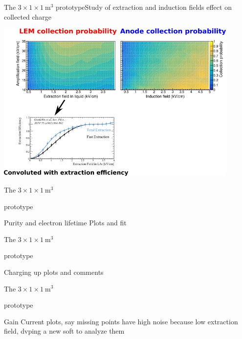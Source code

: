 \documentclass[10pt]{beamer}
\begin{document}
    \begin{frame}{The \texorpdfstring{$3 \times 1 \times \SI{1}{\meter\cubed}$}{311} prototype}{Study of extraction and induction fields effect on collected charge}
    	\begin{scriptsize}
    		\includegraphics[width=0.9\textwidth]{figures/311/effs.png}\\
    	\end{scriptsize} 
    \end{frame}
    
    \begin{frame}{The \texorpdfstring{$3 \times 1 \times \SI{1}{\meter\cubed}$}{311}
    		\begin{scriptsize}
    		\end{scriptsize} prototype}{Purity and electron lifetime}
    	Plots and fit
    \end{frame}
    
    \begin{frame}{The \texorpdfstring{$3 \times 1 \times \SI{1}{\meter\cubed}$}{311}
    		\begin{scriptsize}
    		\end{scriptsize} prototype}{Charging up}
    	plots and comments
    \end{frame}
    
    \begin{frame}{The \texorpdfstring{$3 \times 1 \times \SI{1}{\meter\cubed}$}{311}
    		\begin{scriptsize}
    		\end{scriptsize} prototype}{Gain}
    	Current plots, say missing points have high noise because low extraction field, dvping a new soft to analyze them
    \end{frame}
    
\end{document}
